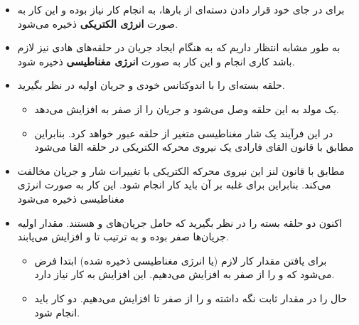 \ELhold


\begin{ELunit}

\begin{itemize}
\tightlist
\item
  برای در جای خود قرار دادن دسته‌ای از بارها، به انجام کار نیاز بوده و این کار به صورت \textbf{انرژی الکتریکی} ذخیره می‌شود.
\item
  به طور مشابه انتظار داریم که به هنگام ایجاد جریان در حلقه‌های هادی نیز لازم باشد کاری انجام و این کار به صورت \textbf{انرژی مغناطیسی} ذخیره شود.
\item
  حلقه بسته‌ای را با اندوکتانس خودی  و جریان اولیه  در نظر بگیرید.

  \begin{itemize}
  \tightlist
  \item
    یک مولد به این حلقه وصل می‌شود و جریان  را از صفر به  افزایش می‌دهد.
  \item
    در این فرآیند یک شار مغناطیسی متغیر از حلقه عبور خواهد کرد. بنابراین مطابق با قانون القای فارادی یک نیروی محرکه الکتریکی در حلقه القا می‌شود
  \end{itemize}
\end{itemize}


\begin{itemize}
\tightlist
\item
  مطابق با قانون لنز این نیروی محرکه الکتریکی با تغییرات شار و جریان مخالفت می‌کند. بنابراین برای غلبه بر آن باید کار انجام شود. این کار به صورت انرژی مغناطیسی ذخیره می‌شود
\end{itemize}


\begin{itemize}
\tightlist
\item
  اکنون دو حلقه بسته را در نظر بگیرید که حامل جریان‌های  و  هستند. مقدار اولیه جریان‌ها صفر بوده و به ترتیب تا  و  افزایش می‌یابند.

  \begin{itemize}
  \tightlist
  \item
    برای یافتن مقدار کار لازم (یا انرژی مغناطیسی ذخیره شده) ابتدا فرض می‌شود که  و  را از صفر به  افزایش می‌دهیم. این افزایش به کار  نیاز دارد.
  \item
    حال  را در مقدار  ثابت نگه داشته و  را از صفر تا  افزایش می‌دهیم. دو کار باید انجام شود.


\end{itemize}
\end{itemize}
\end{ELunit}
